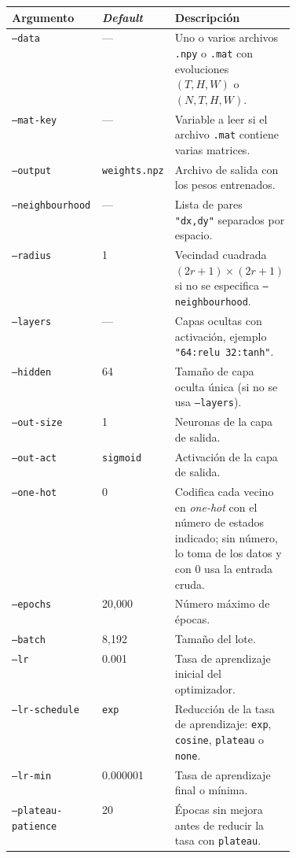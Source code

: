 \begin{table}[H]
    \centering
    \begin{tabular}{l|l|p{0.42\linewidth}}
        \hline
        \textbf{Argumento} & \textbf{\textit{Default}} & \textbf{Descripción} \\ \hline
        \texttt{--data} & --- & Uno o varios archivos \texttt{.npy} o \texttt{.mat} con evoluciones $(T, H, W)$ o $(N, T, H, W)$. \\ \hline
        \texttt{--mat-key} & --- & Variable a leer si el archivo \texttt{.mat} contiene varias matrices. \\ \hline
        \texttt{--output} & \texttt{weights.npz} & Archivo de salida con los pesos entrenados. \\ \hline
        \texttt{--neighbourhood} & --- & Lista de pares \texttt{"dx,dy"} separados por espacio. \\ \hline
        \texttt{--radius} & 1 & Vecindad cuadrada $(2r+1) \times (2r+1)$ si no se especifica \texttt{--neighbourhood}. \\ \hline
        \texttt{--layers} & --- & Capas ocultas con activación, ejemplo \texttt{"64:relu 32:tanh"}. \\ \hline
        \texttt{--hidden} & 64 & Tamaño de capa oculta única (si no se usa \texttt{--layers}). \\ \hline
        \texttt{--out-size} & 1 & Neuronas de la capa de salida. \\ \hline
        \texttt{--out-act} & \texttt{sigmoid} & Activación de la capa de salida. \\ \hline
        \texttt{--one-hot} & 0 & Codifica cada vecino en \textit{one-hot} con el número de estados indicado; sin número, lo toma de los datos y con 0 usa la entrada cruda. \\ \hline
        \texttt{--epochs} & 20,000 & Número máximo de épocas. \\ \hline
        \texttt{--batch} & 8,192 & Tamaño del lote. \\ \hline
        \texttt{--lr} & 0.001 & Tasa de aprendizaje inicial del optimizador. \\ \hline
        \texttt{--lr-schedule} & \texttt{exp} & Reducción de la tasa de aprendizaje: \texttt{exp}, \texttt{cosine}, \texttt{plateau} o \texttt{none}. \\ \hline
        \texttt{--lr-min} & 0.000001 & Tasa de aprendizaje final o mínima. \\ \hline
        \texttt{--plateau-patience} & 20 & Épocas sin mejora antes de reducir la tasa con \texttt{plateau}. \\ \hline

\end{tabular}
\end{table}
